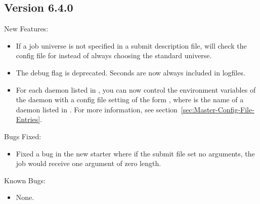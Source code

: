 \subsection{\label{sec:New-6-4-0}Version 6.4.0}

\noindent New Features:

\begin{itemize}

\item If a job universe is not specified in a submit description file, 
  will check the config file for 
instead of always choosing the standard universe. 

\item The  debug flag is deprecated. Seconds are now always
included in logfiles. 

\item For each daemon listed in , you can now control the
environment variables of the daemon with a config file setting of the form
, where  is the name of a
daemon listed in . For more information, see
section~\ref{sec:Master-Config-File-Entries}.

\end{itemize}

\noindent Bugs Fixed:

\begin{itemize}

\item Fixed a bug in the new starter where if the submit file set no
arguments, the job would receive one argument of zero length.

\end{itemize}

\noindent Known Bugs:

\begin{itemize}

\item None.

\end{itemize}

